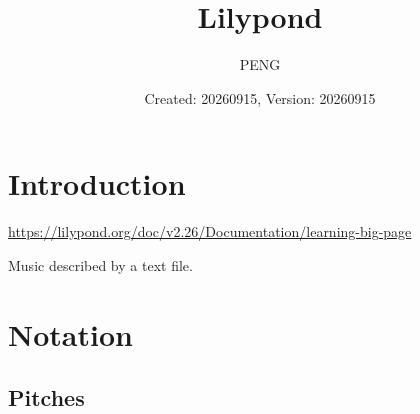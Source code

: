 \documentclass{article}
\title{Lilypond}
\author{PENG}
\date{Created: 20260915, Version: 20260915}
\begin{document}
\maketitle
\tableofcontents
\section{Introduction}
\url{https://lilypond.org/doc/v2.26/Documentation/learning-big-page}

Music described by a text file.

\section{Notation}
\subsection{Pitches}

\printbibliography
\end{document}
